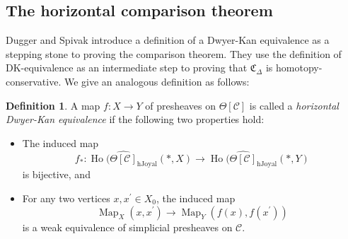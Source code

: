 \documentclass[a4paper]{article}
\numberwithin{equation}{subsection}
\theoremstyle{plain}   %
\theoremstyle{definition}
\newtheorem{defn}[equation]{Definition}
\theoremstyle{remark}
\theoremstyle{plain}
\DeclareMathOperator{\Map}{Map}
\providecommand{\C}{}
\renewcommand{\C}{\ensuremath{\mathcal{C}}}
\newcommand{\cellset}{\ensuremath{\widehat{\Theta[\mathcal{C}]}}}
\begin{document}
\subsection{The horizontal comparison theorem}\label{horizcomparison}
Dugger and Spivak introduce a definition of a Dwyer-Kan equivalence as a stepping stone to proving the comparison theorem.  They use the definition of DK-equivalence as an intermediate step to proving that \(\mathfrak{C}_\Delta\) is homotopy-conservative.  We give an analogous definition as follows:

\begin{defn}
  A map \(f:X\to Y\) of presheaves on \(\Theta[\C]\) is called a \emph{horizontal Dwyer-Kan equivalence} if the following two properties hold:
	\begin{itemize}
		\item The induced map
		      \[f_*:\operatorname{Ho}(\cellset_{\mathrm{hJoyal}}(\ast,X) \to \operatorname{Ho}(\cellset_{\mathrm{hJoyal}}(\ast,Y)\]
		      is bijective, and
		\item For any two vertices \(x,x^\prime\in X_0\), the induced map
		      \[\Map_X(x,x^\prime) \to \Map_Y(f(x),f(x^\prime))\]
		      is a weak equivalence of simplicial presheaves on \(\C\).
	\end{itemize}
\end{defn}
\end{document}
